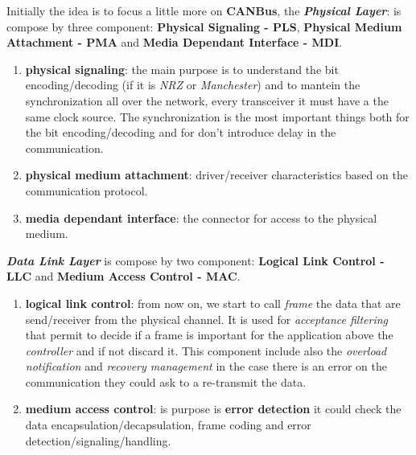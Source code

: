 Initially the idea is to focus a little more on \textbf{CANBus}, the \textbf{\textit{Physical Layer}}: is compose by three component: \textbf{Physical Signaling - PLS}, \textbf{Physical Medium Attachment - PMA} and \textbf{Media Dependant Interface - MDI}.
\begin{enumerate}[nosep]
    \item \textbf{physical signaling}: the main purpose is to understand the bit encoding/decoding (if it is \textit{NRZ} or \textit{Manchester}) and to mantein the synchronization all over the network, every transceiver it must have a the same clock source. The synchronization is the most important things both for the bit encoding/decoding and for don't introduce delay in the communication.
    \item \textbf{physical medium attachment}: driver/receiver characteristics based on the communication protocol.
    \item \textbf{media dependant interface}: the connector for access to the physical medium.
\end{enumerate}
\textbf{\textit{Data Link Layer}} is compose by two component: \textbf{Logical Link Control - LLC} and \textbf{Medium Access Control - MAC}.
\begin{enumerate}[nosep]
    \item \textbf{logical link control}: from now on, we start to call \textit{frame} the data that are send/receiver from the physical channel. It is used for \textit{acceptance filtering} that permit to decide if a frame is important for the application above the \textit{controller} and if not discard it. This component include also the \textit{overload notification} and \textit{recovery management} in the case there is an error on the communication they could ask to a re-transmit the data.
    \item \textbf{medium access control}: is purpose is \textbf{error detection} it could check the data encapsulation/decapsulation, frame coding and error detection/signaling/handling.
\end{enumerate}

